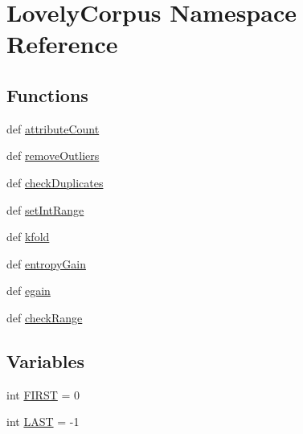 \hypertarget{namespaceLovelyCorpus}{\section{Lovely\-Corpus Namespace Reference}
\label{namespaceLovelyCorpus}
}
\subsection*{Functions}
\begin{DoxyCompactItemize}
\item 
def \hyperlink{namespaceLovelyCorpus_a5be3606fde5af857b78c886bda270e2f}{attribute\-Count}
\item 
def \hyperlink{namespaceLovelyCorpus_a2c0d954a1c41477e81887e5a941251fa}{remove\-Outliers}
\item 
def \hyperlink{namespaceLovelyCorpus_a4423563351da00085aec39ce67902fbf}{check\-Duplicates}
\item 
def \hyperlink{namespaceLovelyCorpus_a65609991e13d0b639ac1520e1d666845}{set\-Int\-Range}
\item 
def \hyperlink{namespaceLovelyCorpus_a84317382c4e7d9b457294b731ecfc59a}{kfold}
\item 
def \hyperlink{namespaceLovelyCorpus_a8a304131798c4b8a33a69fa554a97a1d}{entropy\-Gain}
\item 
def \hyperlink{namespaceLovelyCorpus_a506bbed5530bdb141a96231a1997ebf1}{egain}
\item 
def \hyperlink{namespaceLovelyCorpus_aa049ae6116bbf9cdc5af242ac1b8e2c2}{check\-Range}
\end{DoxyCompactItemize}
\subsection*{Variables}
\begin{DoxyCompactItemize}
\item 
int \hyperlink{namespaceLovelyCorpus_adfa45fc47e2f21cf331cd82de9fc1b8d}{F\-I\-R\-S\-T} = 0
\item 
int \hyperlink{namespaceLovelyCorpus_a43c85bdcbbbe7b7357e099bd6d3dd033}{L\-A\-S\-T} = -\/1
\end{DoxyCompactItemize}


